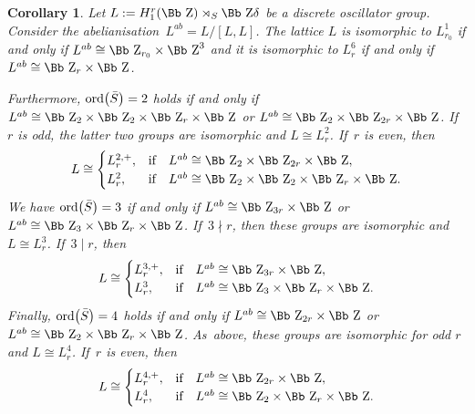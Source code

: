 \documentclass[pdftex]{sigma}
\newcommand\ZZ{{\mbox{\Bb Z}}}
\newcommand{\ord}{{\rm ord}}
\numberwithin{equation}{section}
\newtheorem{Corollary}[Theorem]{Corollary}
\begin{document}
\begin{Corollary}\label{co:iso}
Let $L:=H_1^r(\ZZ)\rtimes_S \ZZ \delta$ be a discrete oscillator group.
Consider the abelianisation~$L^{ab}=L/[L,L]$.
The lattice $L$ is isomorphic to $L^1_{r_0}$ if and only if $L^{ab}\cong\ZZ_{r_0}\times \ZZ^3$ and it is isomorphic to $L^6_r$ if and only if $L^{ab}\cong \ZZ_r\times\ZZ$.

Furthermore, $\ord\big(\bar S\big)=2$ holds if and only if $L^{ab}\cong\ZZ_2\times\ZZ_2\times\ZZ_r\times\ZZ$ or $L^{ab}\cong\ZZ_2\times\ZZ_{2r}\times\ZZ$. If~$r$ is odd, the latter two groups are isomorphic and $L\cong L^2_r$. If~$r$ is even, then
\begin{gather*}
L\cong \begin{cases}
L^{2,+}_{r}, & \text{if}\quad L^{ab}\cong\ZZ_2\times\ZZ_{2r}\times\ZZ,
\\
L^2_{r}, & \text{if}\quad L^{ab}\cong\ZZ_2\times\ZZ_2\times\ZZ_r\times\ZZ.
\end{cases}
\end{gather*}
We have $\ord\big(\bar S\big)=3$ if and only if
$L^{ab}\cong\ZZ_{3r}\times\ZZ$ or
$L^{ab}\cong\ZZ_3\times\ZZ_r\times\ZZ$. If~$3\nmid r$, then these groups are isomorphic and $L\cong L^3_r$. If~$3\mid r$, then
\begin{gather*}
L\cong\begin{cases}
L^{3,+}_{r}, & \text{if}\quad L^{ab}\cong\ZZ_{3r}\times\ZZ,
\\
L^3_{r}, & \text{if}\quad L^{ab}\cong\ZZ_3\times\ZZ_r\times\ZZ.
\end{cases}
\end{gather*}
Finally, $\ord\big(\bar S\big)=4$ holds if and only if
$L^{ab}\cong\ZZ_{2r}\times\ZZ$ or $L^{ab}\cong\ZZ_2\times\ZZ_r\times\ZZ$. As~above, these groups are isomorphic for odd $r$ and
$L\cong L^4_r$. If~$r$ is even, then
\begin{gather*}
L\cong \begin{cases}
L^{4,+}_{r}, & \text{if}\quad L^{ab}\cong\ZZ_{2r}\times\ZZ,
\\
L^4_{r}, & \text{if}\quad L^{ab}\cong\ZZ_2\times\ZZ_r\times\ZZ.
\end{cases}
\end{gather*}
\end{Corollary}
\end{document}
